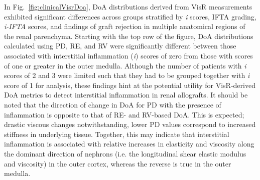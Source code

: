 %
In Fig.~\ref{fig:clinicalVisrDoa}, DoA distributions derived from VisR measurements exhibited significant differences across groups stratified by \emph{i} scores, IFTA grading, \emph{i-IFTA} scores, and findings of graft rejection in multiple anatomical regions of the renal parenchyma. Starting with the top row of the figure, DoA distributions calculated using PD, RE, and RV were significantly different between those associated with interstitial inflammation (\emph{i}) scores of zero from those with scores of one or greater in the outer medulla. Although the number of patients with \emph{i} scores of 2 and 3 were limited such that they had to be grouped together with \emph{i} score of 1 for analysis, these findings hint at the potential utility for VisR-derived DoA metrics to detect interstitial inflammation in renal allografts. It should be noted that the direction of change in DoA for PD with the presence of inflammation is opposite to that of RE- and RV-based DoA. This is expected; drastic viscous changes notwithstanding, lower PD values correspond to increased stiffness in underlying tissue. Together, this may indicate that interstitial inflammation is associated with relative increases in elasticity and viscosity along the dominant direction of nephrons (i.e. the longitudinal shear elastic modulus and viscosity) in the outer cortex, whereas the reverse is true in the outer medulla.

